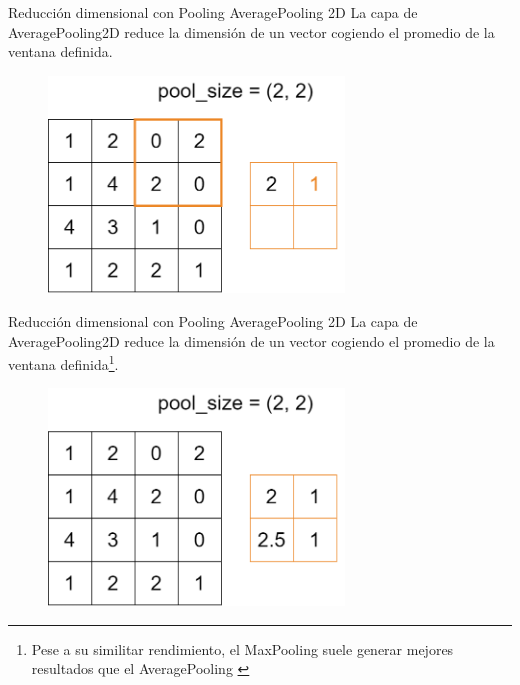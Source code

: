 \begin{frame}{Reducción dimensional con Pooling}
\alert{\Large AveragePooling 2D}
La capa de AveragePooling2D reduce la dimensión de un vector cogiendo el \alert{promedio} de la ventana definida.

\begin{figure}
    \centering
    \includegraphics[width=0.7\textwidth]{figures/Tema 3/AvgPooling_2.png}
\end{figure}
\end{frame}

\begin{frame}{Reducción dimensional con Pooling}
\alert{\Large AveragePooling 2D}
La capa de AveragePooling2D reduce la dimensión de un vector cogiendo el \alert{promedio} de la ventana definida\footnote{Pese a su similitar rendimiento, el MaxPooling suele generar mejores resultados que el AveragePooling \cite{bieder2021comparison}}.

\begin{figure}
    \centering
    \includegraphics[width=0.7\textwidth]{figures/Tema 3/AvgPooling_res.png}
\end{figure}
\end{frame}

